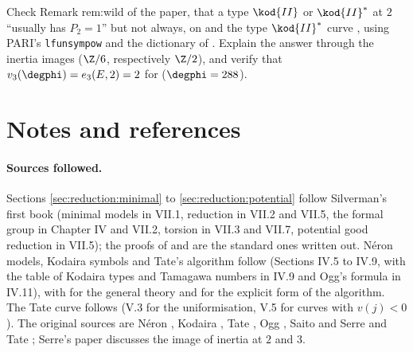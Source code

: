 \begin{exercise}\label{exer:reduction:typeII2}
Check Remark rem:wild of the paper, that a type $\kod{II}$ or $\kod{II}^*$ at $2$ ``usually has $P_2=1$'' but not always, on  and
the type $\kod{II}^*$ curve , using PARI's \texttt{lfunsympow} and the dictionary of . Explain
the answer through the inertia images ($\Z/6$, respectively $\Z/2$), and verify that $v_3(\degphi)=e_3(E,2)=2$ for 
($\degphi=288$).
\end{exercise}

\section{Notes and references}\label{sec:reduction:notes}

\paragraph{Sources followed.} Sections \ref{sec:reduction:minimal} to \ref{sec:reduction:potential} follow Silverman's first book
\cite[Chapter VII]{SilvermanAEC} (minimal models in VII.1, reduction in VII.2 and VII.5, the formal group in Chapter IV and VII.2, torsion
in VII.3 and VII.7, potential good reduction in VII.5); the proofs of  and  are
the standard ones written out. N\'eron models, Kodaira symbols and Tate's algorithm follow \cite[Chapter IV]{SilvermanATAEC} (Sections
IV.5 to IV.9, with the table of Kodaira types and Tamagawa numbers in IV.9 and Ogg's formula in IV.11), with \cite{BLR} for the general
theory and \cite[Section 3.2]{Cremona97} for the explicit form of the algorithm. The Tate curve follows \cite[Chapter V]{SilvermanATAEC}
(V.3 for the uniformisation, V.5 for curves with $v(j)<0$). The original sources are N\'eron \cite{NeronModels}, Kodaira \cite{Kodaira}, Tate
\cite{Tate75}, Ogg \cite{Ogg}, Saito \cite{Saito88} and Serre and Tate \cite{SerreTate68}; Serre's paper \cite[Section 5.6]{Serre72}
discusses the image of inertia at $2$ and $3$.

